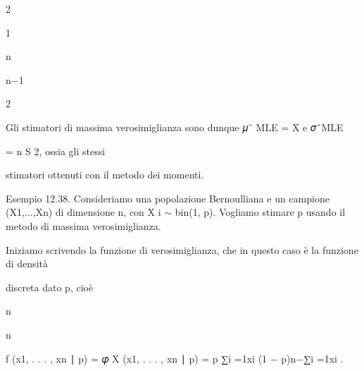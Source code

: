 \documentclass[a4paper,portrait,12pt]{article}
\begin{document}
2





1


\begin{flushleft}
n
\end{flushleft}





\begin{flushleft}
n$-$1
\end{flushleft}


2


\begin{flushleft}
Gli stimatori di massima verosimiglianza sono dunque 𝜇ˆ MLE = X e 𝜎ˆMLE
\end{flushleft}


\begin{flushleft}
= n S 2, ossia gli stessi
\end{flushleft}


\begin{flushleft}
stimatori ottenuti con il metodo dei momenti.
\end{flushleft}





\begin{flushleft}
Esempio 12.38. Consideriamo una popolazione Bernoulliana e un campione (X1,...,Xn) di dimensione n, con X i $\sim$ bin(1, p). Vogliamo stimare p usando il metodo di massima verosimiglianza.
\end{flushleft}


\begin{flushleft}
Iniziamo scrivendo la funzione di verosimiglianza, che in questo caso \`{e} la funzione di densit\`{a}
\end{flushleft}


\begin{flushleft}
discreta dato p, cio\`{e}
\end{flushleft}


\begin{flushleft}
n
\end{flushleft}





\begin{flushleft}
n
\end{flushleft}





\begin{flushleft}
f (x1, . . . , xn ∣ p) = 𝜑 X (x1, . . . , xn ∣ p) = p ∑i =1xi (1 $-$ p)n$-$∑i =1xi .
\end{flushleft}
\end{document}
